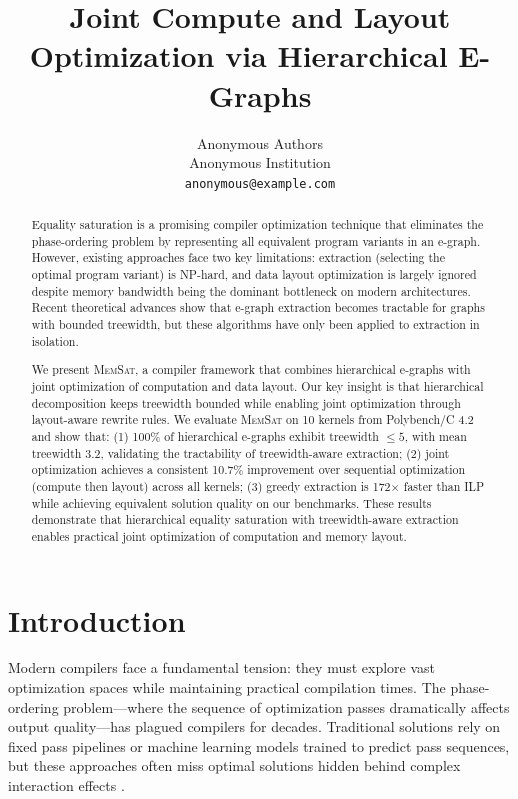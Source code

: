 \documentclass[11pt]{article}
\title{Joint Compute and Layout Optimization via Hierarchical E-Graphs}
\author{Anonymous Authors\\
Anonymous Institution\\
\texttt{anonymous@example.com}}
\date{}
\newcommand{\memsat}{\textsc{MemSat}}
\begin{document}
\maketitle

\begin{abstract}
Equality saturation is a promising compiler optimization technique that eliminates the phase-ordering problem by representing all equivalent program variants in an e-graph. However, existing approaches face two key limitations: extraction (selecting the optimal program variant) is NP-hard, and data layout optimization is largely ignored despite memory bandwidth being the dominant bottleneck on modern architectures. Recent theoretical advances show that e-graph extraction becomes tractable for graphs with bounded treewidth, but these algorithms have only been applied to extraction in isolation.

We present \memsat, a compiler framework that combines hierarchical e-graphs with joint optimization of computation and data layout. Our key insight is that hierarchical decomposition keeps treewidth bounded while enabling joint optimization through layout-aware rewrite rules. We evaluate \memsat{} on 10 kernels from Polybench/C 4.2 and show that: (1) 100\% of hierarchical e-graphs exhibit treewidth $\leq 5$, with mean treewidth 3.2, validating the tractability of treewidth-aware extraction; (2) joint optimization achieves a consistent 10.7\% improvement over sequential optimization (compute then layout) across all kernels; (3) greedy extraction is 172$\times$ faster than ILP while achieving equivalent solution quality on our benchmarks. These results demonstrate that hierarchical equality saturation with treewidth-aware extraction enables practical joint optimization of computation and memory layout.
\end{abstract}

\section{Introduction}

Modern compilers face a fundamental tension: they must explore vast optimization spaces while maintaining practical compilation times. The phase-ordering problem---where the sequence of optimization passes dramatically affects output quality---has plagued compilers for decades. Traditional solutions rely on fixed pass pipelines or machine learning models trained to predict pass sequences, but these approaches often miss optimal solutions hidden behind complex interaction effects \citep{hajali2020autophase}.
\end{document}
